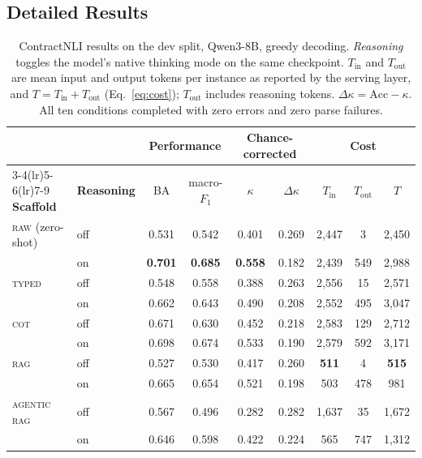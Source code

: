 \documentclass[11pt]{article}
\newcommand{\typed}{\textsc{typed}}
\begin{document}
\subsection{Detailed Results}

\begin{table}[H]
\centering
\footnotesize
\setlength{\tabcolsep}{5pt}
\begin{tabular}{llccccccc}
\toprule
& & \multicolumn{2}{c}{\textbf{Performance}} & \multicolumn{2}{c}{\textbf{Chance-corrected}} & \multicolumn{3}{c}{\textbf{Cost}} \\
\cmidrule(lr){3-4}\cmidrule(lr){5-6}\cmidrule(lr){7-9}
\textbf{Scaffold} & \textbf{Reasoning} & BA & macro-$F_1$ & $\kappa$ & $\Delta\kappa$ & $T_{\mathrm{in}}$ & $T_{\mathrm{out}}$ & $T$ \\
\midrule
\textsc{raw} (zero-shot) & off & 0.531 & 0.542 & 0.401 & 0.269 & 2{,}447 & 3 & 2{,}450 \\
 & on & \textbf{0.701} & \textbf{0.685} & \textbf{0.558} & 0.182 & 2{,}439 & 549 & 2{,}988 \\
\addlinespace[2pt]
\typed{} & off & 0.548 & 0.558 & 0.388 & 0.263 & 2{,}556 & 15 & 2{,}571 \\
 & on & 0.662 & 0.643 & 0.490 & 0.208 & 2{,}552 & 495 & 3{,}047 \\
\addlinespace[2pt]
\textsc{cot} & off & 0.671 & 0.630 & 0.452 & 0.218 & 2{,}583 & 129 & 2{,}712 \\
 & on & 0.698 & 0.674 & 0.533 & 0.190 & 2{,}579 & 592 & 3{,}171 \\
\addlinespace[2pt]
\textsc{rag} & off & 0.527 & 0.530 & 0.417 & 0.260 & \textbf{511} & 4 & \textbf{515} \\
 & on & 0.665 & 0.654 & 0.521 & 0.198 & 503 & 478 & 981 \\
\addlinespace[2pt]
\textsc{agentic rag} & off & 0.567 & 0.496 & 0.282 & 0.282 & 1{,}637 & 35 & 1{,}672 \\
 & on & 0.646 & 0.598 & 0.422 & 0.224 & 565 & 747 & 1{,}312 \\
\bottomrule
\end{tabular}
\caption{ContractNLI results on the dev split, Qwen3-8B, greedy decoding.
\emph{Reasoning} toggles the model's native thinking mode on the same
checkpoint. $T_{\mathrm{in}}$ and $T_{\mathrm{out}}$ are mean input and
output tokens per instance as reported by the serving layer, and
$T=T_{\mathrm{in}}+T_{\mathrm{out}}$ (Eq.~\eqref{eq:cost});
$T_{\mathrm{out}}$ includes reasoning tokens. $\Delta\kappa=\mathrm{Acc}-\kappa$.
All ten conditions completed with zero errors and zero parse failures.}
\label{tab:contractnli_main}
\end{table}
\end{document}
